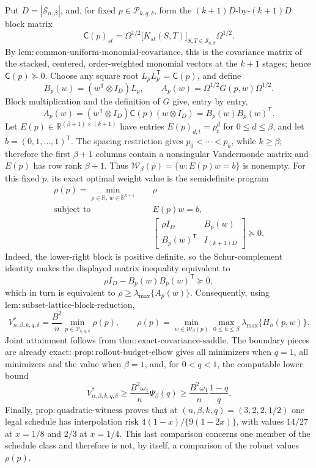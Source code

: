 Put \(D=|\mathcal S_{n,\beta}|\), and, for fixed \(p\in\mathcal P_{k,q,\delta}\), form the \((k+1)D\)-by-\((k+1)D\) block matrix
\[
 \mathsf C(p)_{st}
 =\Omega^{1/2}\bigl[K_{st}(S,T)\bigr]_{S,T\in\mathcal S_{n,\beta}}\Omega^{1/2}.
\]
By \(\mathrm{lem{:}common\text{-}uniform\text{-}monomial\text{-}covariance}\), this is the covariance matrix of the stacked, centered, order-weighted monomial vectors at the \(k+1\) stages; hence \(\mathsf C(p)\succeq0\).  Choose any square root \(L_pL_p^{\mathsf T}=\mathsf C(p)\), and define
\[
 B_p(w)=(w^{\mathsf T}\otimes I_D)L_p,
 \qquad
 A_p(w)=\Omega^{1/2}G(p,w)\Omega^{1/2}.
\]
Block multiplication and the definition of \(G\) give, entry by entry,
\[
 A_p(w)
 =(w^{\mathsf T}\otimes I_D)\mathsf C(p)(w\otimes I_D)
 =B_p(w)B_p(w)^{\mathsf T}.
\]
Let \(E(p)\in\mathbb R^{(\beta+1)\times(k+1)}\) have entries \(E(p)_{d,t}=p_t^d\) for \(0\le d\le\beta\), and let \(b=(0,1,\ldots,1)^{\mathsf T}\).  The spacing restriction gives \(p_0<\cdots<p_k\), while \(k\ge\beta\); therefore the first \(\beta+1\) columns contain a nonsingular Vandermonde matrix and \(E(p)\) has row rank \(\beta+1\).  Thus \(\mathcal W_\beta(p)=\{w:E(p)w=b\}\) is nonempty.  For this fixed \(p\), its exact optimal weight value is the semidefinite program
\[
 \begin{aligned}
 \rho(p)=\min_{\rho\in\mathbb R,\,w\in\mathbb R^{k+1}}\quad&\rho\\
 \text{subject to}\quad&E(p)w=b,\\
 &\begin{bmatrix}
 \rho I_D&B_p(w)\\
 B_p(w)^{\mathsf T}&I_{(k+1)D}
 \end{bmatrix}\succeq0.
 \end{aligned}
\]
Indeed, the lower-right block is positive definite, so the Schur-complement identity makes the displayed matrix inequality equivalent to
\[
 \rho I_D-B_p(w)B_p(w)^{\mathsf T}\succeq0,
\]
which in turn is equivalent to \(\rho\ge\lambda_{\max}\{A_p(w)\}\).  Consequently, using \(\mathrm{lem{:}subset\text{-}lattice\text{-}block\text{-}reduction}\),
\[
 V^*_{n,\beta,k,q,\delta}
 =\frac{B^2}{n}\min_{p\in\mathcal P_{k,q,\delta}}\rho(p),
 \qquad
 \rho(p)=\min_{w\in\mathcal W_\beta(p)}
 \max_{0\le h\le\beta}\lambda_{\max}\{H_h(p,w)\}.
\]
Joint attainment follows from \(\mathrm{thm{:}exact\text{-}covariance\text{-}saddle}\).  The boundary pieces are already exact: \(\mathrm{prop{:}rollout\text{-}budget\text{-}elbow}\) gives all minimizers when \(q=1\), all minimizers and the value when \(\beta=1\), and, for \(0<q<1\), the computable lower bound
\[
 V^*_{n,\beta,k,q,\delta}
 \ge \frac{B^2\omega_1}{n}\Psi_\beta(q)
 \ge \frac{B^2\omega_1}{n}\frac{1-q}{q}.
\]
Finally, \(\mathrm{prop{:}quadratic\text{-}witness}\) proves that at \((n,\beta,k,q)=(3,2,2,1/2)\) one legal schedule has interpolation risk \(4(1-x)/\{9(1-2x)\}\), with values \(14/27\) at \(x=1/8\) and \(2/3\) at \(x=1/4\).  This last comparison concerns one member of the schedule class and therefore is not, by itself, a comparison of the robust values \(\rho(p)\).